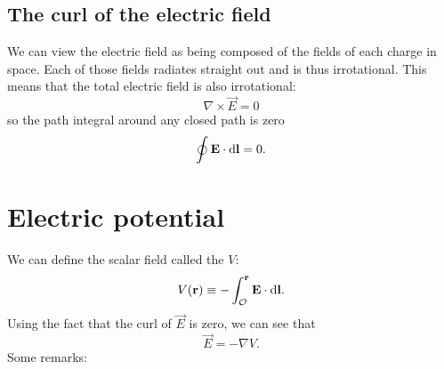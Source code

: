 \subsection{The curl of the electric field}
We can view the electric field as being composed of the fields of each charge in space. Each of those fields radiates straight out and is thus irrotational. This means that the total electric field is also irrotational:
\begin{equation}
\nabla \times \vec{E} = 0
\label{irrotationalE}
\end{equation}
so the path integral around any closed path is zero
\begin{equation}
\oint \bm{\mathrm{E}}\cdot \operatorname{d \!}{\bm{\mathrm{l}}} = 0. \label{loopE}
\end{equation}

\section{Electric potential}
We can define the scalar field called the  $V$:
\[ V(\bm{\mathrm{r}}) \equiv - \int_\mathcal{O}^{\bm{\mathrm{r}}}\bm{\mathrm{E}}\cdot \operatorname{d \!}{\bm{\mathrm{l}}}. \]
Using the fact that the curl of $\vec{E}$ is zero, we can see that
\[ \vec{E} = - \nabla V. \]
Some remarks:
